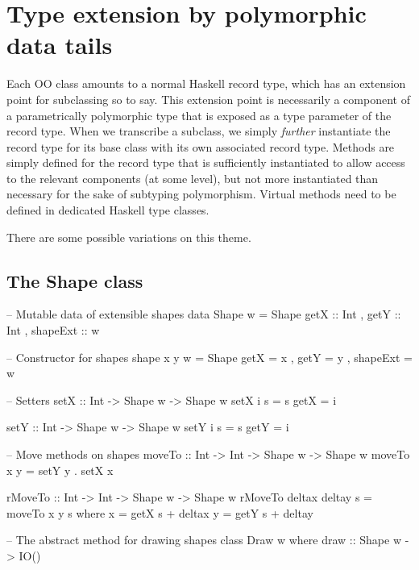 

\medskip

\section{Type extension by polymorphic data tails}

Each OO class amounts to a normal Haskell record type, which has an
extension point for subclassing so to say. This extension point is
necessarily a component of a parametrically polymorphic type that is
exposed as a type parameter of the record type. When we transcribe a
subclass, we simply \emph{further} instantiate the record type for its
base class with its own associated record type. Methods are simply
defined for the record type that is sufficiently instantiated to allow
access to the relevant components (at some level), but not more
instantiated than necessary for the sake of subtyping
polymorphism. Virtual methods need to be defined in dedicated Haskell
type classes.

There are some possible variations on this theme.





\medskip

\subsection{The Shape class}

\begin{code}
-- Mutable data of extensible shapes
data Shape w =
     Shape { getX     :: Int
           , getY     :: Int
           , shapeExt :: w
           }

-- Constructor for shapes
shape x y w = Shape { getX = x
                    , getY = y
                    , shapeExt = w }

-- Setters
setX :: Int -> Shape w -> Shape w
setX i s = s { getX = i }

setY :: Int -> Shape w -> Shape w
setY i s = s { getY = i }

-- Move methods on shapes
moveTo :: Int -> Int -> Shape w -> Shape w
moveTo x y = setY y . setX x 

rMoveTo :: Int -> Int -> Shape w -> Shape w
rMoveTo deltax deltay s = moveTo x y s
 where
  x = getX s + deltax
  y = getY s + deltay

-- The abstract method for drawing shapes
class Draw w
 where
  draw :: Shape w -> IO()
\end{code}



